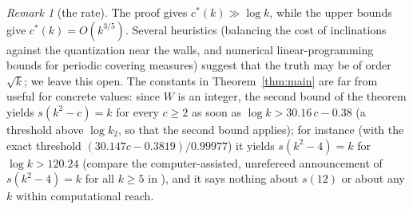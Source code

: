 \documentclass[11pt]{amsart}
\theoremstyle{definition}
\theoremstyle{remark}
\newtheorem{remark}[theorem]{Remark}
\begin{document}
\begin{remark}[the rate]
The proof gives $c^*(k)\gg\log k$, while the upper bounds give $c^*(k)=O(k^{3/5})$. Several heuristics (balancing the
cost of inclinations against the quantization near the walls, and numerical linear-programming bounds for
periodic covering measures) suggest that the truth may be of order $\sqrt k$; we leave this open. The constants in
Theorem~\ref{thm:main} are far from useful for concrete values: since $W$ is an integer, the second bound of the theorem yields
$s(k^2-c)=k$ for every $c\ge2$ as soon as $\log k>30.16\,c-0.38$ (a threshold above $\log k_2$, so that the second bound applies); for instance (with the exact threshold $(30.147c-0.3819)/0.99977$) it yields $s(k^2-4)=k$ for $\log k>120.24$ (compare the computer-assisted, unrefereed announcement of $s(k^2-4)=k$ for all
$k\ge5$ in \cite{Dan}), and it says nothing
about $s(12)$ or about any $k$ within computational reach.
\end{remark}
\end{document}
